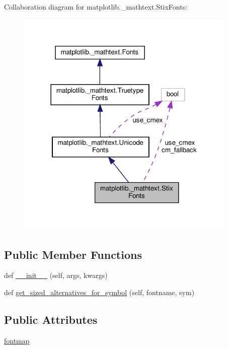 Collaboration diagram for matplotlib.\+\_\+mathtext.\+Stix\+Fonts\+:
\nopagebreak
\begin{figure}[H]
\begin{center}
\leavevmode
\includegraphics[width=298pt]{classmatplotlib_1_1__mathtext_1_1StixFonts__coll__graph}
\end{center}
\end{figure}
\subsection*{Public Member Functions}
\begin{DoxyCompactItemize}
\item 
def \hyperlink{classmatplotlib_1_1__mathtext_1_1StixFonts_a6c73f99d212154a9ada592425636644b}{\+\_\+\+\_\+init\+\_\+\+\_\+} (self, args, kwargs)
\item 
def \hyperlink{classmatplotlib_1_1__mathtext_1_1StixFonts_afc36be85b62529166e353a93bc46fd10}{get\+\_\+sized\+\_\+alternatives\+\_\+for\+\_\+symbol} (self, fontname, sym)
\end{DoxyCompactItemize}
\subsection*{Public Attributes}
\begin{DoxyCompactItemize}
\item 
\hyperlink{classmatplotlib_1_1__mathtext_1_1StixFonts_a9749ec4b4ff92c9732b8365bcdf27971}{fontmap}
\end{DoxyCompactItemize}
